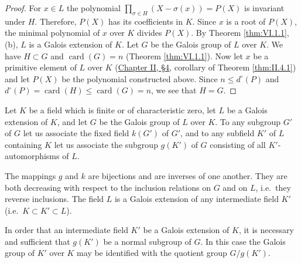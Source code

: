 \begin{proof}
For $x\in L$ the polynomial $\prod_{\sigma\in H}(X-\sigma(x))=P(X)$ is
invariant under $H$. Therefore, $P(X)$ has its coefficients in $K$. Since
$x$ is a root of $P(X)$, the minimal polynomial of $x$ over $K$ divides
$P(X)$. By Theorem \ref{thm:VI.1.1}, (b), $L$ is a Galois extension of
$K$. Let $G$ be the Galois group of $L$ over $K$. We have $H\subset G$ and
$\operatorname{card}(G)=n$ (Theorem \ref{thm:VI.1.1}). Now let $x$ be a
primitive element of $L$ over $K$ (\hyperref[sec:2.4]{Chapter II, §4}, corollary of Theorem
\ref{thm:II.4.1}) and let $P(X)$ be the polynomial constructed above. Since
$n\leq d^{\circ}(P)$ and $d^{\circ}(P)=\operatorname{card}(H)\leq
\operatorname{card}(G)=n$, we see that $H=G$.
\end{proof}

\begin{theorem}
\label{thm:VI.1.2}
Let $K$ be a field which is finite or of characteristic zero, let $L$ be a
Galois extension of $K$, and let $G$ be the Galois group of $L$ over $K$.
To any subgroup $G'$ of $G$ let us associate the fixed field $k(G')$ of
$G'$, and to any subfield $K'$ of $L$ containing $K$ let us associate the
subgroup $g(K')$ of $G$ consisting of all $K'$-automorphisms of $L$.
\begin{alist}
\item The mappings $g$ and $k$ are bijections and are inverses of one
another. They are both decreasing with respect to the inclusion relations
on $G$ and on $L$, i.e.\ they reverse inclusions. The field $L$ is a
Galois extension of any intermediate field $K'$ (i.e.\
$K\subset K'\subset L$).
\item In order that an intermediate field $K'$ be a Galois extension of
$K$, it is necessary and sufficient that $g(K')$ be a normal subgroup of
$G$. In this case the Galois group of $K'$ over $K$ may be identified with
the quotient group $G/g(K')$.
\end{alist}
\end{theorem}

